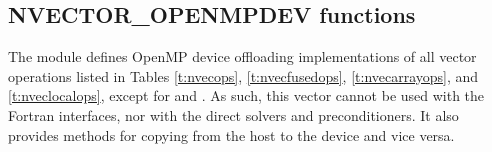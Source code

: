 \subsection{NVECTOR\_OPENMPDEV functions}
\label{ss:nvec_openmpdev_functions}

The {\nvecopenmpdev} module defines OpenMP device offloading implementations of
all vector operations listed in Tables \ref{t:nvecops}, \ref{t:nvecfusedops},
\ref{t:nvecarrayops}, and \ref{t:nveclocalops}, except for  and
. As such, this vector cannot be used with the
{\sundials} Fortran interfaces, nor with the {\sundials} direct solvers and
preconditioners. It also provides methods for copying from the host to
the device and vice versa.

